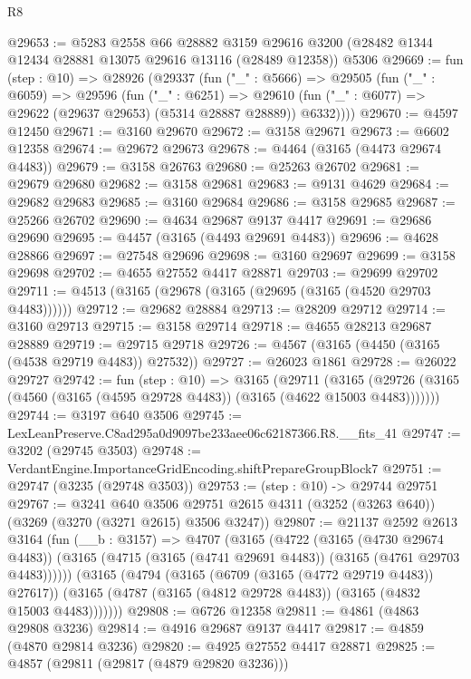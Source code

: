 \begin{lexlean}{R8}
\begin{coremodule}
@29653 := @5283
    @2558
    @66
    @28882
    @3159
    @29616
    @3200
    (@28482 @1344 @12434 @28881 @13075 @29616 @13116 (@28489 @12358))
    @5306
@29669 := fun (step : @10) =>
  @28926
    (@29337
      (fun ("_" : @5666) =>
      @29505
        (fun ("_" : @6059) =>
        @29596
          (fun ("_" : @6251) =>
          @29610 (fun ("_" : @6077) => @29622 (@29637 @29653) (@5314 @28887 @28889)) @6332))))
@29670 := @4597 @12450
@29671 := @3160 @29670
@29672 := @3158 @29671
@29673 := @6602 @12358
@29674 := @29672 @29673
@29678 := @4464 (@3165 (@4473 @29674 @4483))
@29679 := @3158 @26763
@29680 := @25263 @26702
@29681 := @29679 @29680
@29682 := @3158 @29681
@29683 := @9131 @4629
@29684 := @29682 @29683
@29685 := @3160 @29684
@29686 := @3158 @29685
@29687 := @25266 @26702
@29690 := @4634 @29687 @9137 @4417
@29691 := @29686 @29690
@29695 := @4457 (@3165 (@4493 @29691 @4483))
@29696 := @4628 @28866
@29697 := @27548 @29696
@29698 := @3160 @29697
@29699 := @3158 @29698
@29702 := @4655 @27552 @4417 @28871
@29703 := @29699 @29702
@29711 := @4513 (@3165 (@29678 (@3165 (@29695 (@3165 (@4520 @29703 @4483))))))
@29712 := @29682 @28884
@29713 := @28209 @29712
@29714 := @3160 @29713
@29715 := @3158 @29714
@29718 := @4655 @28213 @29687 @28889
@29719 := @29715 @29718
@29726 := @4567 (@3165 (@4450 (@3165 (@4538 @29719 @4483)) @27532))
@29727 := @26023 @1861
@29728 := @26022 @29727
@29742 := fun (step : @10) =>
  @3165
    (@29711
      (@3165 (@29726 (@3165 (@4560 (@3165 (@4595 @29728 @4483)) (@3165 (@4622 @15003 @4483)))))))
@29744 := @3197 @640 @3506
@29745 := LexLeanPreserve.C8ad295a0d9097be233aee06c62187366.R8.__fits_41
@29747 := @3202 (@29745 @3503)
@29748 := VerdantEngine.ImportanceGridEncoding.shiftPrepareGroupBlock7
@29751 := @29747 (@3235 (@29748 @3503))
@29753 := (step : @10) -> @29744 @29751
@29767 := @3241
    @640
    @3506
    @29751
    @2615
    @4311
    (@3252 (@3263 @640))
    (@3269 (@3270 (@3271 @2615) @3506 @3247))
@29807 := @21137
    @2592
    @2613
    @3164
    (fun (__b : @3157) =>
    @4707
      (@3165
        (@4722
          (@3165 (@4730 @29674 @4483))
          (@3165 (@4715 (@3165 (@4741 @29691 @4483)) (@3165 (@4761 @29703 @4483))))))
      (@3165
        (@4794
          (@3165 (@6709 (@3165 (@4772 @29719 @4483)) @27617))
          (@3165 (@4787 (@3165 (@4812 @29728 @4483)) (@3165 (@4832 @15003 @4483)))))))
@29808 := @6726 @12358
@29811 := @4861 (@4863 @29808 @3236)
@29814 := @4916 @29687 @9137 @4417
@29817 := @4859 (@4870 @29814 @3236)
@29820 := @4925 @27552 @4417 @28871
@29825 := @4857 (@29811 (@29817 (@4879 @29820 @3236)))

\end{coremodule}
\end{lexlean}
